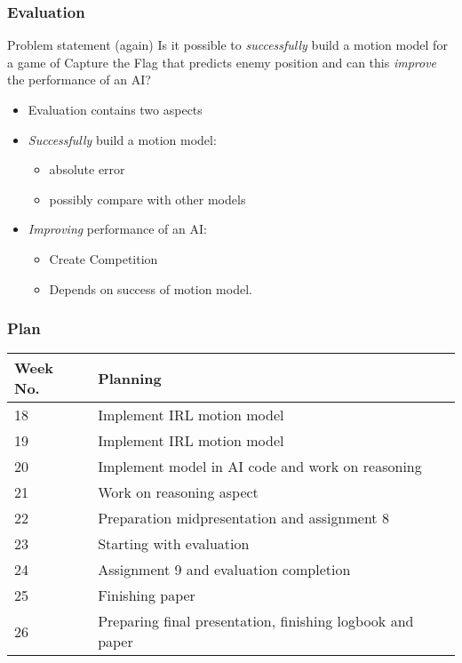 \documentclass{beamer}
\begin{document}
\begin{frame}
\frametitle{Evaluation}
\begin{block}{Problem statement (again)}
Is it possible to \emph{successfully} build a motion model for a game of Capture the Flag that predicts enemy
position and can this \emph{improve} the performance of an AI?
\end{block}
\begin{itemize}
    \item Evaluation contains two aspects
    \item \emph{Successfully} build a motion model:
        \begin{itemize}
            \item absolute error
            \item possibly compare with other models
        \end{itemize}
    \item \emph{Improving} performance of an AI:
        \begin{itemize}
            \item Create Competition
            \item Depends on success of motion model.
        \end{itemize}
\end{itemize}
\end{frame}

\begin{frame}
\frametitle{Plan}
\begin{table}
\centering
    \begin{tabular}{| l | l |}
      \hline                        
      Week No. & Planning \\
      \hline
      \hline
      18 &  Implement IRL motion model \\
      \hline
      19 &  Implement IRL motion model \\
      \hline
      20 &  Implement model in AI code and work on reasoning\\
      \hline
      21 &  Work on reasoning aspect \\
      \hline
      22 &  Preparation midpresentation and assignment 8\\
      \hline
      23 &  Starting with evaluation\\
      \hline
      24 &  Assignment 9 and evaluation completion \\
      \hline
      25 &  Finishing paper \\
      \hline
      26 &  Preparing final presentation, finishing logbook and paper \\
      \hline
    \end{tabular}
\end{table}
\end{frame}



\end{document}

